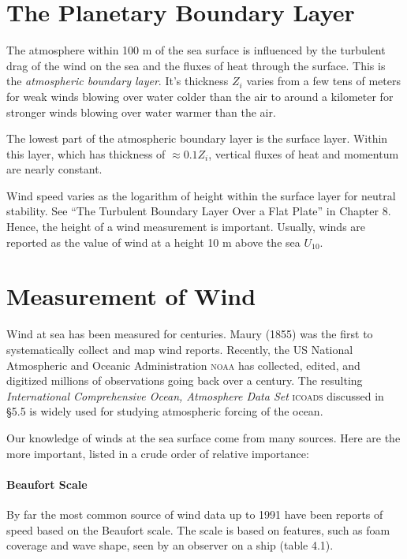 \section{The Planetary Boundary Layer}
The atmosphere within 100 m of the sea surface is influenced by the
turbulent drag of the wind on the sea and the fluxes of heat through
the surface. This is the \textit{atmospheric boundary
  layer}. It's thickness
$Z_i$ varies from a few tens of meters for weak winds blowing over
water colder than the air to around a kilometer for stronger winds
blowing over water warmer than the air.

The lowest part of the atmospheric boundary layer is the surface
layer. Within this layer, which has thickness of $\approx 0.1 Z_i$,
vertical fluxes of heat and momentum are nearly constant.

Wind speed varies as the logarithm of height within the surface layer
for neutral stability. See ``The Turbulent Boundary Layer Over a Flat
Plate'' in Chapter 8. Hence, the height of a wind measurement is
important. Usually, winds are reported as the value of wind at a
height 10 m above the sea $U_{10}$.

\section{Measurement of Wind}
Wind at sea has been measured for
centuries. Maury (1855) was the first to systematically collect and
map wind reports. Recently, the US National Atmospheric and Oceanic
Administration \textsc{noaa} has collected, edited, and digitized
millions of observations going back over a century. The resulting
\textit{International Comprehensive Ocean, Atmosphere Data Set}
\textsc{icoads} discussed in \S 5.5 is widely used for
studying atmospheric forcing of the ocean.

Our knowledge of winds at the sea surface come from many sources. Here
are the more important, listed in a crude order of relative
importance:

\paragraph{Beaufort Scale}
By far the most common source of wind data
up to 1991 have been reports of speed based on the Beaufort scale. The
scale is based on features, such as foam coverage and wave shape, seen
by an observer on a ship (table 4.1).

